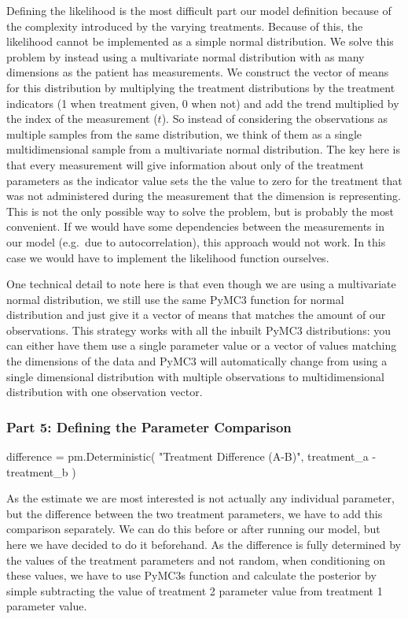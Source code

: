 \documentclass[12pt,a4paper,leqno]{report}
\theoremstyle{plain}
\theoremstyle{definition}
\theoremstyle{remark}
\begin{document}
Defining the likelihood is the most difficult part our model definition because of the
complexity introduced by the varying treatments. Because of this, the likelihood cannot
be implemented as a simple normal distribution. We solve this problem by instead using a
multivariate normal distribution with as many dimensions as the patient has
measurements. We construct the vector of means for this distribution by multiplying the
treatment distributions by the treatment indicators (1 when
treatment given, 0 when not) and add the trend multiplied by the index of the
measurement (\(t\)). So instead of considering
the observations as multiple samples from the same distribution, we think of them as a
single multidimensional sample from
a multivariate normal distribution. The key here is that every measurement will give
information about only of the treatment parameters as the indicator value sets the
the value to zero for the treatment that was not administered during the
measurement that the dimension is representing. This is not the only possible way to solve the
problem, but is probably the most convenient. If we would have some
dependencies between the measurements in our model (e.g.\ due to autocorrelation), this approach
would not work. In this case we would have to implement the likelihood function
ourselves.

One technical detail to note here is that even though we are using a multivariate normal
distribution, we still use the same PyMC3 function for normal distribution and just give
it a vector of means that matches the amount of our observations. This strategy works
with all the inbuilt PyMC3 distributions: you can either have them use a single
parameter value or a vector of values matching the dimensions of the data and PyMC3 will automatically
change from using a single dimensional distribution with multiple observations to
multidimensional distribution with one observation vector.

\subsubsection*{Part 5: Defining the Parameter Comparison}

\bigskip
\begin{pyverbatim}[][fontsize=\footnotesize]
    difference = pm.Deterministic(
        "Treatment Difference (A-B)", treatment_a - treatment_b
    )
\end{pyverbatim}
\smallskip

As the estimate we are most interested is not actually any individual parameter, but the
difference between the two treatment parameters, we have to add this comparison separately.
We can do this before or after running our model, but here we have decided to do it
beforehand. As the difference is fully determined by the values of the treatment
parameters and not random, when conditioning on these values, we have to use PyMC3s
 function and calculate the posterior
by simple subtracting the value of treatment 2 parameter value from treatment 1
parameter value.
\end{document}
